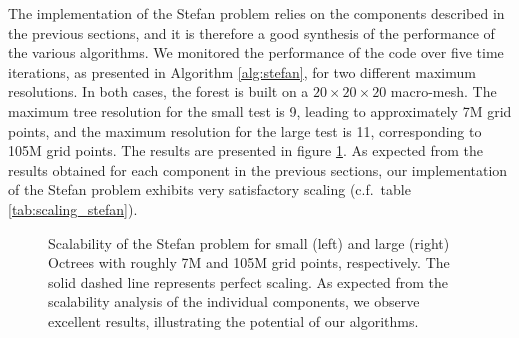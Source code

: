 The implementation of the Stefan problem relies on the components described in the previous sections, and it is therefore a good synthesis of the performance of the various algorithms. We monitored the performance of the code over five time iterations, as presented in Algorithm \ref{alg:stefan}, for two different maximum resolutions. In both cases, the forest is built on a $20\times20\times20$ macro-mesh. The maximum tree resolution for the small test is 9, leading to approximately 7M grid points, and the maximum resolution for the large test is 11, corresponding to 105M grid points. The results are presented in figure \ref{fig:stefan_scaling}. As expected from the results obtained for each component in the previous sections, our implementation of the Stefan problem exhibits very satisfactory scaling (c.f.\ table \ref{tab:scaling_stefan}).

\begin{figure}
\centering
{}
\caption{Scalability of the Stefan problem for small (left) and large (right) Octrees with roughly 7M and 105M grid points, respectively. The solid dashed line represents perfect scaling. As expected from the scalability analysis of the individual components, we observe excellent results, illustrating the potential of our algorithms.}
\label{fig:stefan_scaling}
\end{figure}


